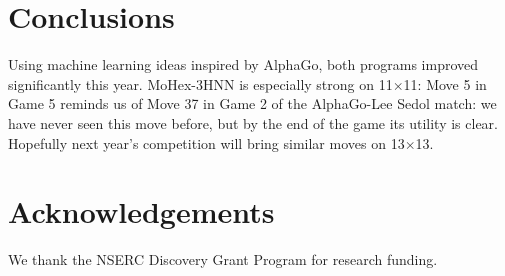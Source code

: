 \documentclass{IOS-Book-Article}
\def\Mt{\mbox{\sc MoHex-3HNN}}
\begin{document}
\section{Conclusions}
Using machine learning ideas inspired by AlphaGo,
both programs improved significantly this year.
\Mt{} is especially strong on 11$\times$11: Move 5 in Game 5 reminds
us of Move 37 in Game 2 of the AlphaGo-Lee Sedol match:
we have never seen this move before, 
but by the end of the game its utility is clear.
Hopefully next year's competition will bring similar moves on 13$\times$13.

\section*{Acknowledgements}
We thank the NSERC Discovery Grant Program for research funding.


\end{document}
